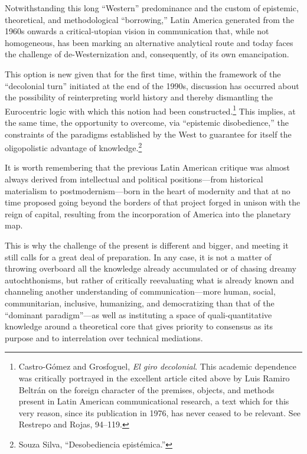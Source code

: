 \documentclass{tufte-handout}
\begin{document}
Notwithstanding this long ``Western'' predominance and the custom of
epistemic, theoretical, and methodological ``borrowing,'' Latin America
generated from the 1960s onwards a critical-utopian vision in
communication that, while not homogeneous, has been marking an
alternative analytical route and today faces the challenge of
de-Westernization and, consequently, of its own emancipation.

This option is new given that for the first time, within the framework
of the ``decolonial turn'' initiated at the end of the 1990s, discussion
has occurred about the possibility of reinterpreting world history and
thereby dismantling the Eurocentric logic with which this notion had
been constructed.\footnote{Castro-Gómez and Grosfoguel, \emph{El giro
  decolonial}. This academic dependence was critically portrayed in the
  excellent article cited above by Luis Ramiro Beltrán on the foreign
  character of the premises, objects, and methods present in Latin
  American communicational research, a text which for this very reason,
  since its publication in 1976, has never ceased to be relevant. See
  Restrepo and Rojas, 94--119.} This implies, at the same time, the
opportunity to overcome, via ``epistemic disobedience,'' the constraints
of the paradigms established by the West to guarantee for itself the
oligopolistic advantage of knowledge.\footnote{Souza Silva,
  ``Desobediencia epistémica.''}

It is worth remembering that the previous Latin American critique was
almost always derived from intellectual and political positions---from
historical materialism to postmodernism---born in the heart of modernity
and that at no time proposed going beyond the borders of that project
forged in unison with the reign of capital, resulting from the
incorporation of America into the planetary map.

This is why the challenge of the present is different and bigger, and
meeting it still calls for a great deal of preparation. In any case, it
is not a matter of throwing overboard all the knowledge already
accumulated or of chasing dreamy autochthonisms, but rather of
critically reevaluating what is already known and channeling another
understanding of communication---more human, social, communitarian,
inclusive, humanizing, and democratizing than that of the ``dominant
paradigm''---as well as instituting a space of quali-quantitative
knowledge around a theoretical core that gives priority to consensus as
its purpose and to interrelation over technical mediations.
\end{document}
